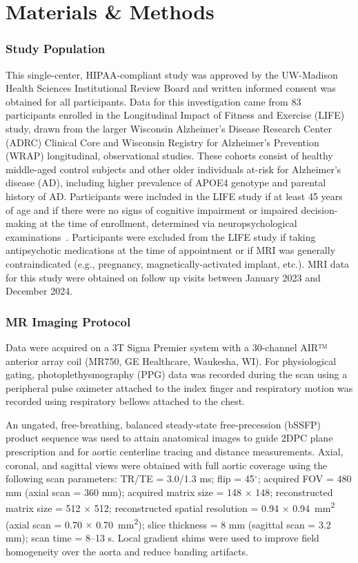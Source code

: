 \section{Materials \& Methods}\label{sec:life_methods}
\subsubsection{Study Population}
This single-center, HIPAA-compliant study was approved by the UW-Madison Health Sciences Institutional Review Board and written informed consent was obtained for all participants. Data for this investigation came from 83 participants enrolled in the Longitudinal Impact of Fitness and Exercise (LIFE) study, drawn from the larger Wisconsin Alzheimer's Disease Research Center (ADRC) Clinical Core and Wisconsin Registry for Alzheimer's Prevention (WRAP) longitudinal, observational studies. These cohorts consist of healthy middle-aged control subjects and other older individuals at-risk for Alzheimer's disease (AD), including higher prevalence of APOE4 genotype and parental history of AD\@. Participants were included in the LIFE study if at least 45 years of age and if there were no signs of cognitive impairment or impaired decision-making at the time of enrollment, determined via neuropsychological examinations~\cite{jackNIAAAResearchFramework2018,langhoughkoscikValidityEvidenceResearch2021}. Participants were excluded from the LIFE study if taking antipsychotic medications at the time of appointment or if MRI was generally contraindicated (e.g., pregnancy, magnetically-activated implant, etc.). MRI data for this study were obtained on follow up visits between January 2023 and December 2024. 

\subsubsection{MR Imaging Protocol}
Data were acquired on a 3T Signa Premier system with a 30-channel AIR™ anterior array coil (MR750, GE Healthcare, Waukesha, WI). For physiological gating, photoplethysmography (PPG) data was recorded during the scan using a peripheral pulse oximeter attached to the index finger and respiratory motion was recorded using respiratory bellows attached to the chest. 

An ungated, free-breathing, balanced steady-state free-precession (bSSFP) product sequence was used to attain anatomical images to guide 2DPC plane prescription and for aortic centerline tracing and distance measurements. Axial, coronal, and sagittal views were obtained with full aortic coverage using the following scan parameters: TR/TE = 3.0/1.3 ms; flip = 45$^\circ$; acquired FOV = 480 mm (axial scan = 360 mm); acquired matrix size = 148 $\times$ 148; reconstructed matrix size = 512 $\times$ 512; reconstructed spatial resolution = 0.94 $\times$ \qty{0.94}{\mm^2} (axial scan = 0.70 $\times$ \qty{0.70}{\mm^2}); slice thickness = 8 mm (sagittal scan = 3.2 mm); scan time = 8--13 s. Local gradient shims were used to improve field homogeneity over the aorta and reduce banding artifacts. 

